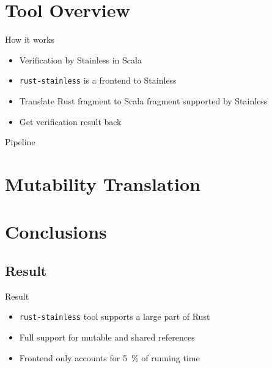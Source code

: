 \section{Tool Overview}

\begin{frame}{How it works}
\begin{itemize}
  \item Verification by Stainless in Scala
  \item \texttt{rust-stainless} is a frontend to Stainless
  \item Translate Rust fragment to Scala fragment supported by Stainless
  \item Get verification result back
\end{itemize}
\end{frame}

\begin{frame}{Pipeline}
\centering

\end{frame}




\section{Mutability Translation}













\section{Conclusions}

\subsection{Result}

\begin{frame}{Result}
\begin{itemize}
  \item \texttt{rust-stainless} tool supports a large part of Rust
  \item Full support for mutable and shared references
  \item Frontend only accounts for 5~\% of running time
\end{itemize}
\end{frame}


